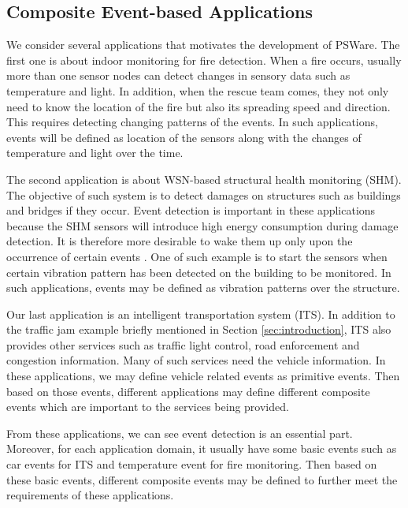 \subsection{Composite Event-based Applications}
We consider several applications that motivates the development of PSWare. The first one is about indoor monitoring for fire detection. When a fire occurs, usually more than one sensor nodes can detect changes in sensory data such as temperature and light. In addition, when the rescue team comes, they not only need to know the location of the fire but also its spreading speed and direction. This requires detecting changing patterns of the events. In such applications, events will be defined as location of the sensors along with the changes of temperature and light over the time.

The second application is about WSN-based structural health monitoring (SHM). The objective of such system is to detect damages on structures such as buildings and bridges if they occur. Event detection is important in these applications because the SHM sensors will introduce high energy consumption during damage detection. It is therefore more desirable to wake them up only upon the occurrence of certain events \cite{jangshm}. One of such example is to start the sensors when certain vibration pattern has been detected on the building to be monitored. In such applications, events may be defined as vibration patterns over the structure.

Our last application is an intelligent transportation system (ITS). In addition to the traffic jam example briefly mentioned in Section \ref{sec:introduction}, ITS also provides other services such as traffic light control, road enforcement and congestion information. Many of such services need the vehicle information. In these applications, we may define vehicle related events as primitive events. Then based on those events, different applications may define different composite events which are important to the services being provided.

From these applications, we can see event detection is an essential part. Moreover, for each application domain, it usually have some basic events such as car events for ITS and temperature event for fire monitoring. Then based on these basic events, different composite events may be defined to further meet the requirements of these applications.
